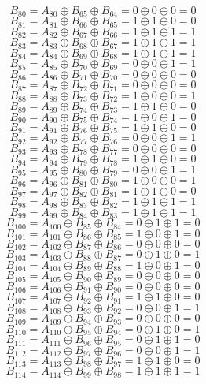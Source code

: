 \documentclass[12pt,onecolumn]{article}
\begin{document}
$$B_{80} = A_{80} \oplus B_{65} \oplus B_{64} = 0 \oplus 0 \oplus 0 = 0$$
$$B_{81} = A_{81} \oplus B_{66} \oplus B_{65} = 1 \oplus 1 \oplus 0 = 0$$
$$B_{82} = A_{82} \oplus B_{67} \oplus B_{66} = 1 \oplus 1 \oplus 1 = 1$$
$$B_{83} = A_{83} \oplus B_{68} \oplus B_{67} = 1 \oplus 1 \oplus 1 = 1$$
$$B_{84} = A_{84} \oplus B_{69} \oplus B_{68} = 1 \oplus 1 \oplus 1 = 1$$
$$B_{85} = A_{85} \oplus B_{70} \oplus B_{69} = 0 \oplus 0 \oplus 1 = 1$$
$$B_{86} = A_{86} \oplus B_{71} \oplus B_{70} = 0 \oplus 0 \oplus 0 = 0$$
$$B_{87} = A_{87} \oplus B_{72} \oplus B_{71} = 0 \oplus 0 \oplus 0 = 0$$
$$B_{88} = A_{88} \oplus B_{73} \oplus B_{72} = 1 \oplus 0 \oplus 0 = 1$$
$$B_{89} = A_{89} \oplus B_{74} \oplus B_{73} = 1 \oplus 1 \oplus 0 = 0$$
$$B_{90} = A_{90} \oplus B_{75} \oplus B_{74} = 1 \oplus 0 \oplus 1 = 0$$
$$B_{91} = A_{91} \oplus B_{76} \oplus B_{75} = 1 \oplus 1 \oplus 0 = 0$$
$$B_{92} = A_{92} \oplus B_{77} \oplus B_{76} = 0 \oplus 0 \oplus 1 = 1$$
$$B_{93} = A_{93} \oplus B_{78} \oplus B_{77} = 0 \oplus 0 \oplus 0 = 0$$
$$B_{94} = A_{94} \oplus B_{79} \oplus B_{78} = 1 \oplus 1 \oplus 0 = 0$$
$$B_{95} = A_{95} \oplus B_{80} \oplus B_{79} = 0 \oplus 0 \oplus 1 = 1$$
$$B_{96} = A_{96} \oplus B_{81} \oplus B_{80} = 1 \oplus 0 \oplus 0 = 1$$
$$B_{97} = A_{97} \oplus B_{82} \oplus B_{81} = 1 \oplus 1 \oplus 0 = 0$$
$$B_{98} = A_{98} \oplus B_{83} \oplus B_{82} = 1 \oplus 1 \oplus 1 = 1$$
$$B_{99} = A_{99} \oplus B_{84} \oplus B_{83} = 1 \oplus 1 \oplus 1 = 1$$
$$B_{100} = A_{100} \oplus B_{85} \oplus B_{84} = 0 \oplus 1 \oplus 1 = 0$$
$$B_{101} = A_{101} \oplus B_{86} \oplus B_{85} = 1 \oplus 0 \oplus 1 = 0$$
$$B_{102} = A_{102} \oplus B_{87} \oplus B_{86} = 0 \oplus 0 \oplus 0 = 0$$
$$B_{103} = A_{103} \oplus B_{88} \oplus B_{87} = 0 \oplus 1 \oplus 0 = 1$$
$$B_{104} = A_{104} \oplus B_{89} \oplus B_{88} = 1 \oplus 0 \oplus 1 = 0$$
$$B_{105} = A_{105} \oplus B_{90} \oplus B_{89} = 0 \oplus 0 \oplus 0 = 0$$
$$B_{106} = A_{106} \oplus B_{91} \oplus B_{90} = 0 \oplus 0 \oplus 0 = 0$$
$$B_{107} = A_{107} \oplus B_{92} \oplus B_{91} = 1 \oplus 1 \oplus 0 = 0$$
$$B_{108} = A_{108} \oplus B_{93} \oplus B_{92} = 0 \oplus 0 \oplus 1 = 1$$
$$B_{109} = A_{109} \oplus B_{94} \oplus B_{93} = 0 \oplus 0 \oplus 0 = 0$$
$$B_{110} = A_{110} \oplus B_{95} \oplus B_{94} = 0 \oplus 1 \oplus 0 = 1$$
$$B_{111} = A_{111} \oplus B_{96} \oplus B_{95} = 0 \oplus 1 \oplus 1 = 0$$
$$B_{112} = A_{112} \oplus B_{97} \oplus B_{96} = 0 \oplus 0 \oplus 1 = 1$$
$$B_{113} = A_{113} \oplus B_{98} \oplus B_{97} = 1 \oplus 1 \oplus 0 = 0$$
$$B_{114} = A_{114} \oplus B_{99} \oplus B_{98} = 1 \oplus 1 \oplus 1 = 1$$
\end{document}
